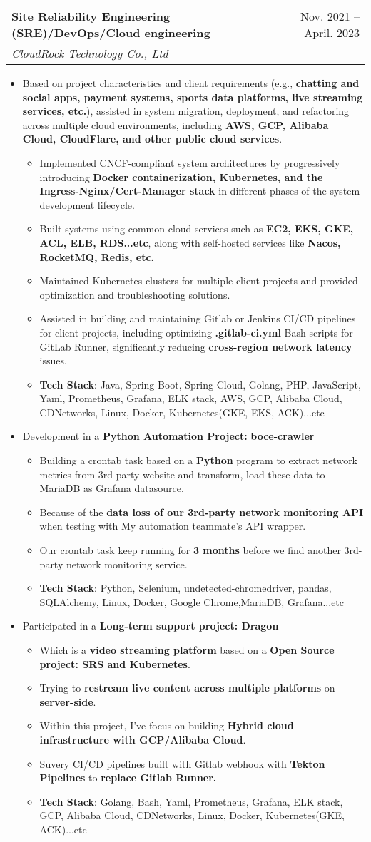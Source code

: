 \documentclass[letterpaper,11pt]{article}
\makeatletter
\newcommand{\resumeItem}[1]{
  \item\small{
    {#1 \vspace{-1pt}}
  }
}
\newcommand{\resumeSubheading}[4]{
  \vspace{-1pt}\item
    \begin{tabular*}{\textwidth}[t]{l@{\extracolsep{\fill}}r}
      \textbf{#1} & {\color{dark-grey}\small #2}\vspace{1pt}\\ %
      \textit{#3} & {\color{dark-grey} \small #4}\\ %
    \end{tabular*}\vspace{-4pt}
}
\newcommand{\resumeSubItem}[1]{
  \begin{itemize}
    \item \small{#1 \vspace{-1pt}}
  \end{itemize}
}
\newcommand{\resumeItemListStart}{\begin{itemize}}
\newcommand{\resumeItemListEnd}{\end{itemize}\vspace{0pt}}
\makeatother
\begin{document}
  \resumeSubheading
  {Site Reliability Engineering (SRE)/DevOps/Cloud engineering}{Nov. 2021 -- April. 2023}
  {CloudRock Technology Co., Ltd}{}  
  \resumeItemListStart
    \resumeItem{Based on project characteristics and client requirements (e.g., \textbf{chatting and social apps, payment systems, sports data platforms, live streaming services, etc.}), assisted in system migration, deployment, and refactoring across multiple cloud environments, including \textbf{AWS, GCP, Alibaba Cloud, CloudFlare, and other public cloud services}.}      
      \resumeSubItem{Implemented CNCF-compliant system architectures by progressively introducing \textbf{Docker containerization, Kubernetes, and the Ingress-Nginx/Cert-Manager stack} in different phases of the system development lifecycle.}
      \resumeSubItem{Built systems using common cloud services such as \textbf{EC2, EKS, GKE, ACL, ELB, RDS...etc}, along with self-hosted services like \textbf{Nacos, RocketMQ, Redis, etc.}}
      \resumeSubItem{Maintained Kubernetes clusters for multiple client projects and provided optimization and troubleshooting solutions.}
      \resumeSubItem{Assisted in building and maintaining Gitlab or Jenkins CI/CD pipelines for client projects, including optimizing \textbf{.gitlab-ci.yml} Bash scripts for GitLab Runner, significantly reducing \textbf{cross-region network latency} issues.}
      \resumeSubItem{\textbf{Tech Stack}: Java, Spring Boot, Spring Cloud, Golang, PHP, JavaScript, Yaml, Prometheus, Grafana, ELK stack, AWS, GCP, Alibaba Cloud, CDNetworks, Linux, Docker, Kubernetes(GKE, EKS, ACK)...etc}
    \resumeItem{Development in a \textbf{Python Automation Project:} \textbf{boce-crawler}}
      \resumeSubItem{Building a crontab task based on a \textbf{Python} program to extract network metrics from 3rd-party website and transform, load these data to MariaDB as Grafana datasource.}
      \resumeSubItem{Because of the \textbf{data loss of our 3rd-party network monitoring API}  when testing with My automation teammate's API wrapper.}
      \resumeSubItem{Our crontab task keep running for \textbf{3 months} before we find another 3rd-party network monitoring service.}
      \resumeSubItem{\textbf{Tech Stack}: Python, Selenium, undetected-chromedriver, pandas, SQLAlchemy, Linux, Docker, Google Chrome,MariaDB, Grafana...etc}    
    \resumeItem{Participated in a \textbf{Long-term support project: Dragon}}
      \resumeSubItem{Which is a \textbf{video streaming platform} based on a \textbf{Open Source project: SRS and Kubernetes}.}
      \resumeSubItem{Trying to \textbf{restream live content across multiple platforms} on \textbf{server-side}.}
      \resumeSubItem{Within this project, I've focus on building \textbf{Hybrid cloud infrastructure with GCP/Alibaba Cloud}.}
      \resumeSubItem{Suvery CI/CD pipelines built with Gitlab webhook with \textbf{Tekton Pipelines} to \textbf{replace Gitlab Runner.}}
      \resumeSubItem{\textbf{Tech Stack}: Golang, Bash, Yaml, Prometheus, Grafana, ELK stack, GCP, Alibaba Cloud, CDNetworks, Linux, Docker, Kubernetes(GKE, ACK)...etc}
  \resumeItemListEnd
\end{document}
